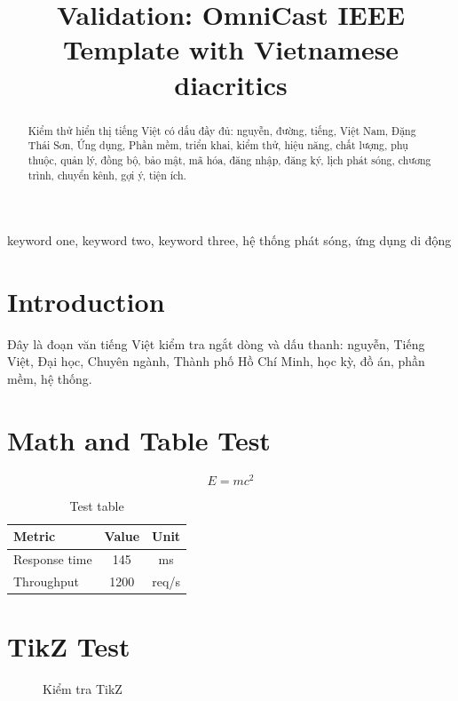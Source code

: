 \documentclass[conference,a4paper]{IEEEtran}
\title{Validation: OmniCast IEEE Template with Vietnamese diacritics}
\author{\IEEEauthorblockN{Test Author}\IEEEauthorblockA{Group OmniCast}}
\begin{document}
\maketitle
\begin{abstract}
Kiểm thử hiển thị tiếng Việt có dấu đầy đủ: nguyễn, đường, tiếng, Việt Nam, Đặng Thái Sơn, Ứng dụng, Phần mềm, triển khai, kiểm thử, hiệu năng, chất lượng, phụ thuộc, quản lý, đồng bộ, bảo mật, mã hóa, đăng nhập, đăng ký, lịch phát sóng, chương trình, chuyển kênh, gợi ý, tiện ích.
\end{abstract}
\begin{IEEEkeywords}
keyword one, keyword two, keyword three, hệ thống phát sóng, ứng dụng di động
\end{IEEEkeywords}

\section{Introduction}
Đây là đoạn văn tiếng Việt kiểm tra ngắt dòng và dấu thanh: nguyễn, Tiếng Việt, Đại học, Chuyên ngành, Thành phố Hồ Chí Minh, học kỳ, đồ án, phần mềm, hệ thống.

\section{Math and Table Test}
\begin{equation}
E = mc^2
\end{equation}

\begin{table}[H]
\caption{Test table}
\label{tab:test}
\begin{tabular}{lcc}
\toprule
Metric & Value & Unit \\
\midrule
Response time & 145 & ms \\
Throughput & 1200 & req/s \\
\bottomrule
\end{tabular}
\end{table}

\section{TikZ Test}
\begin{figure}[H]
\centering
{}
\caption{Kiểm tra TikZ}
\end{figure}
\end{document}
